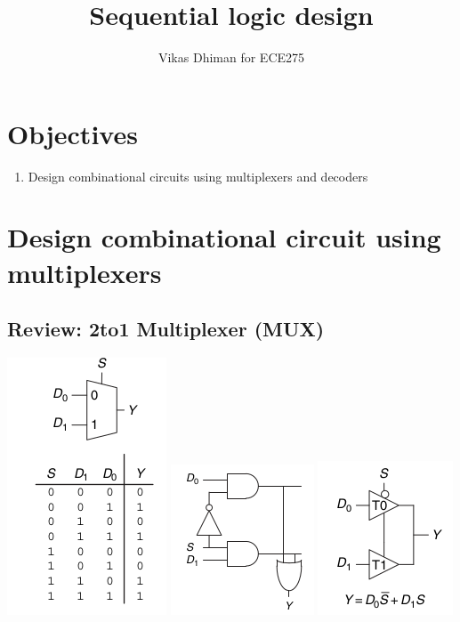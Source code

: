 \documentclass{article}
\author{Vikas Dhiman for ECE275}
\title{Sequential logic design}
\begin{document}
\maketitle


\section{Objectives}
\begin{enumerate}
   \item Design combinational circuits using multiplexers and decoders
\end{enumerate}

\section{Design combinational circuit using multiplexers ~\cite[Section~2.8.1]{harris2022digital}}

\subsection{Review: 2to1 Multiplexer (MUX)}
\includegraphics[width=0.3\linewidth]{./media/harrisfig2.54-2to1-mux-symb-tt.png}
\includegraphics[width=0.3\linewidth]{./media/harrisfig2.55-2to1-mux.png}
\includegraphics[width=0.3\linewidth]{./media/harrisfig2.56-2to1-mux-tristate-buffs.png}
\end{document}
